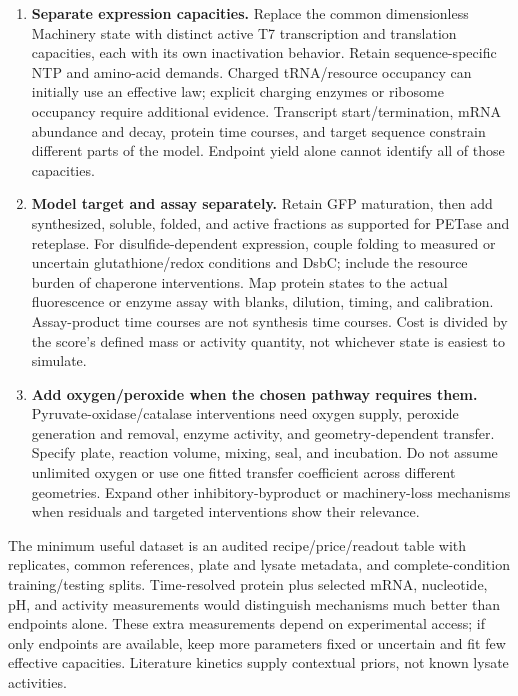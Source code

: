 \begin{enumerate}
\item \textbf{Separate expression capacities.} Replace the common dimensionless
Machinery state with distinct active T7 transcription and translation capacities,
each with its own inactivation behavior. Retain sequence-specific NTP and
amino-acid demands. Charged tRNA/resource occupancy can initially use an
effective law; explicit charging enzymes or ribosome occupancy require additional
evidence. Transcript start/termination, mRNA abundance and decay, protein time
courses, and target sequence constrain different parts of the model. Endpoint
yield alone cannot identify all of those capacities.

\item \textbf{Model target and assay separately.} Retain GFP maturation, then
add synthesized, soluble, folded, and active fractions as supported for PETase
and reteplase. For disulfide-dependent expression, couple folding to measured or
uncertain glutathione/redox conditions and DsbC; include the resource burden of
chaperone interventions\cite{hunt}. Map protein states to the actual fluorescence
or enzyme assay with blanks, dilution, timing, and calibration. Assay-product
time courses are not synthesis time courses. Cost is divided by the score's
defined mass or activity quantity, not whichever state is easiest to simulate.

\item \textbf{Add oxygen/peroxide when the chosen pathway requires them.}
Pyruvate-oxidase/catalase interventions need oxygen supply, peroxide generation
and removal, enzyme activity, and geometry-dependent transfer. Specify plate,
reaction volume, mixing, seal, and incubation. Do not assume unlimited oxygen
or use one fitted transfer coefficient across different geometries. Expand
other inhibitory-byproduct or machinery-loss mechanisms when residuals and
targeted interventions show their relevance.
\end{enumerate}

The minimum useful dataset is an audited recipe/price/readout table with
replicates, common references, plate and lysate metadata, and complete-condition
training/testing splits. Time-resolved protein plus selected mRNA, nucleotide,
pH, and activity measurements would distinguish mechanisms much better than
endpoints alone. These extra measurements depend on experimental access; if
only endpoints are available, keep more parameters fixed or uncertain and fit
few effective capacities. Literature kinetics supply contextual priors, not
known lysate activities.

